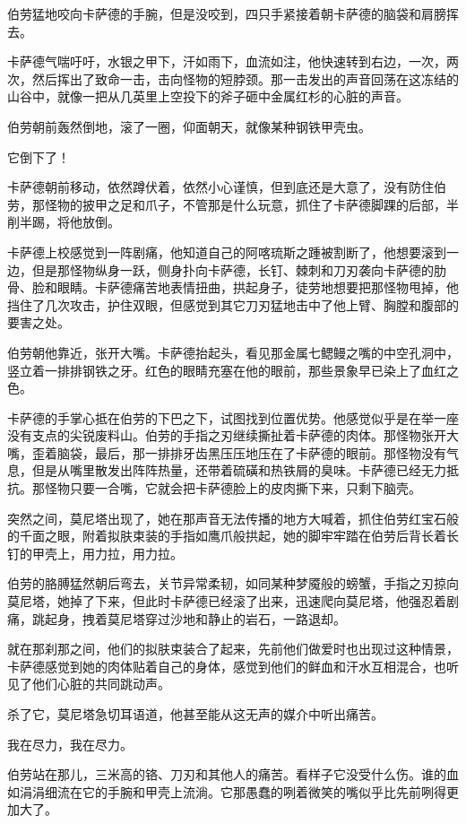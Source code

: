 \documentclass[AutoFakeBold=true]{book}
\begin{document}
伯劳猛地咬向卡萨德的手腕，但是没咬到，四只手紧接着朝卡萨德的脑袋和肩膀挥去。

卡萨德气喘吁吁，水银之甲下，汗如雨下，血流如注，他快速转到右边，一次，两次，然后挥出了致命一击，击向怪物的短脖颈。那一击发出的声音回荡在这冻结的山谷中，就像一把从几英里上空投下的斧子砸中金属红杉的心脏的声音。

伯劳朝前轰然倒地，滚了一圈，仰面朝天，就像某种钢铁甲壳虫。

{\kaishu 它倒下了！}

卡萨德朝前移动，依然蹲伏着，依然小心谨慎，但到底还是大意了，没有防住伯劳，那怪物的披甲之足和爪子，不管那是什么玩意，抓住了卡萨德脚踝的后部，半削半踢，将他放倒。

卡萨德上校感觉到一阵剧痛，他知道自己的阿喀琉斯之踵被割断了，他想要滚到一边，但是那怪物纵身一跃，侧身扑向卡萨德，长钉、棘刺和刀刃袭向卡萨德的肋骨、脸和眼睛。卡萨德痛苦地表情扭曲，拱起身子，徒劳地想要把那怪物甩掉，他挡住了几次攻击，护住双眼，但感觉到其它刀刃猛地击中了他上臂、胸膛和腹部的要害之处。

伯劳朝他靠近，张开大嘴。卡萨德抬起头，看见那金属七鳃鳗之嘴的中空孔洞中，竖立着一排排钢铁之牙。红色的眼睛充塞在他的眼前，那些景象早已染上了血红之色。

卡萨德的手掌心抵在伯劳的下巴之下，试图找到位置优势。他感觉似乎是在举一座没有支点的尖锐废料山。伯劳的手指之刃继续撕扯着卡萨德的肉体。那怪物张开大嘴，歪着脑袋，最后，那一排排牙齿黑压压地压在了卡萨德的眼前。那怪物没有气息，但是从嘴里散发出阵阵热量，还带着硫磺和热铁屑的臭味。卡萨德已经无力抵抗。那怪物只要一合嘴，它就会把卡萨德脸上的皮肉撕下来，只剩下脑壳。

突然之间，莫尼塔出现了，她在那声音无法传播的地方大喊着，抓住伯劳红宝石般的千面之眼，附着拟肤束装的手指如鹰爪般拱起，她的脚牢牢踏在伯劳后背长着长钉的甲壳上，用力拉，用力拉。

伯劳的胳膊猛然朝后弯去，关节异常柔韧，如同某种梦魇般的螃蟹，手指之刃掠向莫尼塔，她掉了下来，但此时卡萨德已经滚了出来，迅速爬向莫尼塔，他强忍着剧痛，跳起身，拽着莫尼塔穿过沙地和静止的岩石，一路退却。

就在那刹那之间，他们的拟肤束装合了起来，先前他们做爱时也出现过这种情景，卡萨德感觉到她的肉体贴着自己的身体，感觉到他们的鲜血和汗水互相混合，也听见了他们心脏的共同跳动声。

{\kaishu 杀了它}，莫尼塔急切耳语道，他甚至能从这无声的媒介中听出痛苦。

{\kaishu 我在尽力，我在尽力。}

伯劳站在那儿，三米高的铬、刀刃和其他人的痛苦。看样子它没受什么伤。谁的血如涓涓细流在它的手腕和甲壳上流淌。它那愚蠢的咧着微笑的嘴似乎比先前咧得更加大了。
\end{document}
